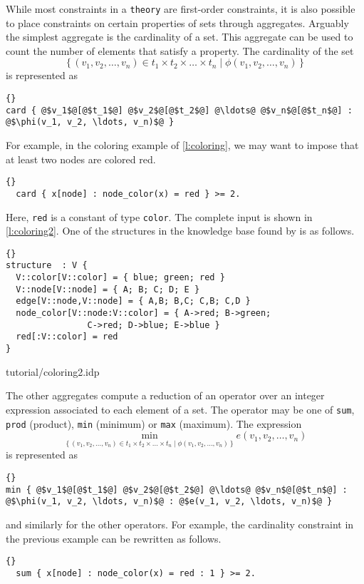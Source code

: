 \documentclass{article}
\begin{document}
While most constraints in a \texttt{theory} are first-order constraints,
it is also possible to place constraints on certain properties of sets
through aggregates.
Arguably the simplest aggregate is the cardinality of a set.
This aggregate can be used to count the number of elements that
satisfy a property.
The cardinality of the set
$$
\{\,
(v_1, v_2, \ldots, v_n) \in t_1 \times t_2 \times \ldots \times t_n \mid
\phi(v_1, v_2, \ldots, v_n)
\,\}
$$
is represented as
\begin{lstlisting}[escapechar=@]{}
card { @$v_1$@[@$t_1$@] @$v_2$@[@$t_2$@] @\ldots@ @$v_n$@[@$t_n$@] : @$\phi(v_1, v_2, \ldots, v_n)$@ }
\end{lstlisting}
For example, in the coloring example of \autoref{l:coloring},
we may want to impose that at least two nodes are colored red.
\begin{lstlisting}{}
  card { x[node] : node_color(x) = red } >= 2.
\end{lstlisting}
Here, \texttt{red} is a constant of type \texttt{color}.
The complete input is shown in \autoref{l:coloring2}.
One of the structures in the knowledge base found by \idp is as follows.
\begin{lstlisting}{}
structure  : V {
  V::color[V::color] = { blue; green; red }
  V::node[V::node] = { A; B; C; D; E }
  edge[V::node,V::node] = { A,B; B,C; C,B; C,D }
  node_color[V::node:V::color] = { A->red; B->green;
			    C->red; D->blue; E->blue }
  red[:V::color] = red
}
\end{lstlisting}


	{tutorial/coloring2.idp}

The other aggregates compute a reduction of an operator over
an integer expression associated to each element of a set.
The operator may be one of \texttt{sum},
\texttt{prod} (product), \texttt{min} (minimum) or \texttt{max} (maximum).
The expression
$$
\min_{
\{\,
(v_1, v_2, \ldots, v_n) \in t_1 \times t_2 \times \ldots \times t_n \mid
\phi(v_1, v_2, \ldots, v_n)
\,\}} e(v_1, v_2, \ldots, v_n)
$$
is represented as
\begin{lstlisting}[escapechar=@]{}
min { @$v_1$@[@$t_1$@] @$v_2$@[@$t_2$@] @\ldots@ @$v_n$@[@$t_n$@] : @$\phi(v_1, v_2, \ldots, v_n)$@ : @$e(v_1, v_2, \ldots, v_n)$@ }
\end{lstlisting}
and similarly for the other operators.
For example, the cardinality constraint in the previous example
can be rewritten as follows.
\begin{lstlisting}{}
  sum { x[node] : node_color(x) = red : 1 } >= 2.
\end{lstlisting}
\end{document}
